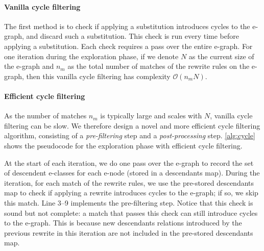 \paragraph{Vanilla cycle filtering}
The first method is to check if applying a substitution introduces cycles to the e-graph, and discard such a substitution.
This check is run every time before applying a substitution.
Each check requires a pass over the entire e-graph.
For one iteration during the exploration phase, if we denote $N$ as the current size of the e-graph and $n_m$ as the total number of matches of the rewrite rules on the e-graph, then this vanilla cycle filtering has complexity $\mathcal{O}(n_m N)$.

\paragraph{Efficient cycle filtering}

As the number of matches $n_m$ is typically large and scales with $N$, vanilla cycle filtering can be slow.
We therefore design a novel and more efficient cycle filtering algorithm, consisting of a \textit{pre-filtering} step and a \textit{post-processing} step.
\autoref{alg:cycle} shows the pseudocode for the exploration phase with efficient cycle filtering.

At the start of each iteration, we do one pass over the e-graph to record the set of descendent e-classes for each e-node (stored in a descendants map).
During the iteration, for each match of the rewrite rules, we use the pre-stored descendants map to check if  applying a rewrite introduces cycles to the e-graph; if so, we skip this match.
Line 3--9 implements the pre-filtering step.
Notice that this check is sound but not complete: a match that passes this check can still introduce cycles to the e-graph.
This is because new descendants relations introduced by the previous rewrite in this iteration are not included in the pre-stored descendants map.

